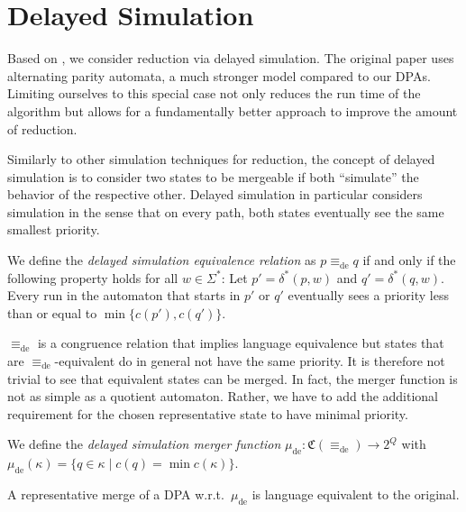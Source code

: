 \section{Delayed Simulation}

Based on \cite{FritzWilke06}, we consider reduction via delayed simulation. The original paper uses alternating parity automata, a much stronger model compared to our DPAs. Limiting ourselves to this special case not only reduces the run time of the algorithm but allows for a fundamentally better approach to improve the amount of reduction.

Similarly to other simulation techniques for reduction, the concept of delayed simulation is to consider two states to be mergeable if both \enquote{simulate} the behavior of the respective other. Delayed simulation in particular considers simulation in the sense that on every path, both states eventually see the same smallest priority.

\begin{definition}
	We define the \emph{delayed simulation equivalence relation} as $p \equiv_\text{de} q$ if and only if the following property holds for all $w \in \Sigma^*$: Let $p' = \delta^*(p, w)$ and $q' = \delta^*(q, w)$. Every run in the automaton that starts in $p'$ or $q'$ eventually sees a priority less than or equal to $\min \{c(p'), c(q')\}$.
\end{definition}

$\equiv_\text{de}$ is a congruence relation that implies language equivalence but states that are $\equiv_\text{de}$-equivalent do in general not have the same priority. It is therefore not trivial to see that equivalent states can be merged. In fact, the merger function is not as simple as a quotient automaton. Rather, we have to add the additional requirement for the chosen representative state to have minimal priority.

\begin{definition}
	We define the \emph{delayed simulation merger function} $\mu_\text{de} : \mathfrak{C}(\equiv_\text{de}) \rightarrow 2^Q$ with $\mu_\text{de}(\kappa) = \{q \in \kappa \mid c(q) = \min c(\kappa)\}$.
\end{definition}

\begin{theorem}
	A representative merge of a DPA w.r.t.\ $\mu_\text{de}$ is language equivalent to the original.
\end{theorem}

